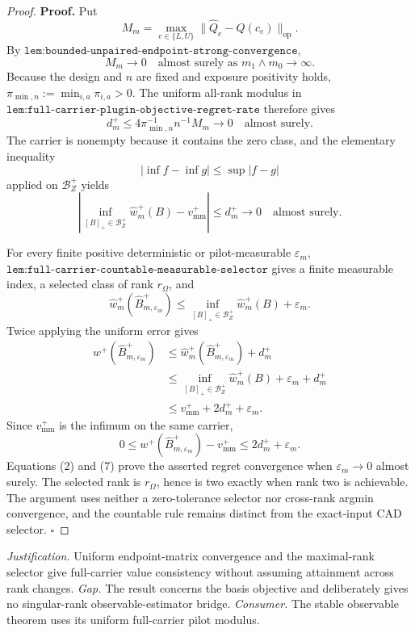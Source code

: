 \documentclass{article}
\begin{document}
\begin{proof}
\textbf{Proof.}
Put
\[
M_m=\max_{e\in\{L,U\}}\lVert\widehat Q_e-Q(c_e)\rVert_{\mathrm{op}}.
\]
By \(\texttt{lem:bounded-unpaired-endpoint-strong-convergence}\),
\[
M_m\longrightarrow0
\quad\text{almost surely as }m_1\wedge m_0\to\infty.
\tag{1}
\]
Because the design and \(n\) are fixed and exposure positivity holds,
\(\pi_{\min,n}:=\min_{i,a}\pi_{i,a}>0\).  The uniform all-rank modulus in \(\texttt{lem:full-carrier-plugin-objective-regret-rate}\) therefore gives
\[
d_m^+\le4\pi_{\min,n}^{-1}n^{-1}M_m\longrightarrow0
\quad\text{almost surely}.
\tag{2}
\]
The carrier is nonempty because it contains the zero class, and the elementary inequality
\[
|\inf f-\inf g|\le\sup|f-g|
\tag{3}
\]
applied on \(\mathcal B_Z^+\) yields
\[
\left|\inf_{[B]_+\in\mathcal B_Z^+}\widehat w_m^+(B)-v_{\mathrm{mm}}^+\right|
\le d_m^+\longrightarrow0
\quad\text{almost surely}.
\tag{4}
\]

For every finite positive deterministic or pilot-measurable \(\varepsilon_m\), \(\texttt{lem:full-carrier-countable-measurable-selector}\) gives a finite measurable index, a selected class of rank \(r_\Omega\), and
\[
\widehat w_m^+(\widehat B_{m,\varepsilon_m}^+)
\le\inf_{[B]_+\in\mathcal B_Z^+}\widehat w_m^+(B)+\varepsilon_m.
\tag{5}
\]
Twice applying the uniform error gives
\[
\begin{aligned}
w^+(\widehat B_{m,\varepsilon_m}^+)
&\le\widehat w_m^+(\widehat B_{m,\varepsilon_m}^+)+d_m^+\\
&\le\inf_{[B]_+\in\mathcal B_Z^+}\widehat w_m^+(B)+\varepsilon_m+d_m^+\\
&\le v_{\mathrm{mm}}^++2d_m^++\varepsilon_m.
\end{aligned}
\tag{6}
\]
Since \(v_{\mathrm{mm}}^+\) is the infimum on the same carrier,
\[
0\le w^+(\widehat B_{m,\varepsilon_m}^+)-v_{\mathrm{mm}}^+
\le2d_m^++\varepsilon_m.
\tag{7}
\]
Equations (2) and (7) prove the asserted regret convergence when \(\varepsilon_m\to0\) almost surely.  The selected rank is \(r_\Omega\), hence is two exactly when rank two is achievable.  The argument uses neither a zero-tolerance selector nor cross-rank argmin convergence, and the countable rule remains distinct from the exact-input CAD selector. \(\square\)
\end{proof}
\par\smallskip\noindent \textit{Justification.} Uniform endpoint-matrix convergence and the maximal-rank selector give full-carrier value consistency without assuming attainment across rank changes. \textit{Gap.} The result concerns the basis objective and deliberately gives no singular-rank observable-estimator bridge. \textit{Consumer.} The stable observable theorem uses its uniform full-carrier pilot modulus.
\end{document}
